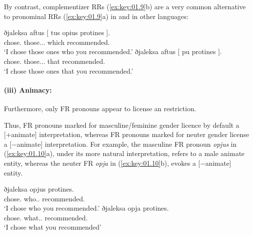 \documentclass[output=paper]{langsci/langscibook}
\begin{document}
\ea {}\label{ex:key:01.8}
	\z
\z

By contrast, complementizer \glspl{RR} (\ref{ex:key:01.9}b)  are a very common alternative to
pronominal \glspl{RR} (\ref{ex:key:01.9}a) in  and in other languages:

\ea {}\label{ex:key:01.9}
	\ea
		\gll ðjaleksa aftus [ {tus opius} protines ].\\
        chose.\Fsg{} those.\M.\Pl.\Acc{} {} which recommended.\Ssg{}\\
		\glt \enquote*{I chose those ones who you recommended.}
	\ex
		\gll ðjaleksa aftus [ pu protines ].\\
        chose.\Fsg{} those.\M.\Pl.\Acc{} {} that recommended.\Ssg{}\\
		\glt \enquote*{I chose those ones that you recommended.}
	\z
\z

\paragraph*{(iii) Animacy:} Furthermore, only \gls{FR} pronouns appear to
license an  restriction.

Thus, \gls{FR} pronouns marked for masculine/feminine gender licence by default
a [+animate] interpretation, whereas \gls{FR} pronouns  marked for neuter
gender license a [−animate] interpretation. For example, the masculine \gls{FR}
pronoun \emph{opjus} in (\ref{ex:key:01.10}a), under its more natural interpretation, refers to
a male animate entity, whereas the neuter \gls{FR} \emph{opja} in (\ref{ex:key:01.10}b), evokes
a [−animate] entity.

\ea {}\label{ex:key:01.10}
	\ea
		\gll ðjaleksa opjus protines.\\
			chose.\Fsg{} who.\M{}.\Pl{} recommended.\Ssg{}\\
		\glt \enquote*{I chose who you recommended.}
	\ex
		\gll ðjaleksa opja protines.\\
			chose.\Fsg{} what.\glossN.\Pl{} recommended.\Ssg{}\\
		\glt \enquote*{I chose what you recommended}
	\z
\z
\end{document}
